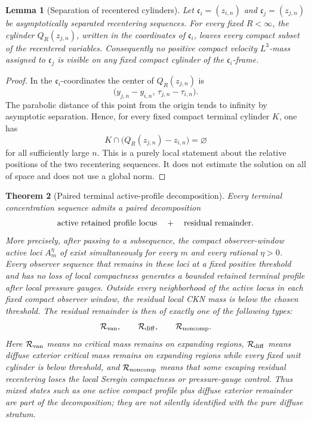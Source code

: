 \documentclass[11pt]{amsart}
\numberwithin{equation}{section}
\theoremstyle{plain}
\newtheorem{theorem}{Theorem}[section]
\newtheorem{lemma}[theorem]{Lemma}
\theoremstyle{definition}
\theoremstyle{remark}
\begin{document}
\begin{lemma}[Separation of recentered cylinders]
\label{lem:separated-recentered-cylinders}
Let \(\mathfrak c_i=(z_{i,n})\) and \(\mathfrak c_j=(z_{j,n})\) be
asymptotically separated recentering sequences.  For every fixed \(R<\infty\), the
cylinder \(Q_R(z_{j,n})\), written in the coordinates of \(\mathfrak c_i\),
leaves every compact subset of the recentered variables.  Consequently
no positive compact velocity \(L^3\)-mass assigned to \(\mathfrak c_j\) is visible on any
fixed compact cylinder of the \(\mathfrak c_i\)-frame.
\end{lemma}

\begin{proof}
In the \(\mathfrak c_i\)-coordinates the center of \(Q_R(z_{j,n})\) is
\[
   \bigl(y_{j,n}-y_{i,n},\,\tau_{j,n}-\tau_{i,n}\bigr).
\]
The parabolic distance of this point from the origin tends to infinity by
asymptotic separation.  Hence, for every fixed compact terminal cylinder
\(K\), one has
\[
   K\cap\bigl(Q_R(z_{j,n})-z_{i,n}\bigr)=\varnothing
\]
for all sufficiently large \(n\).  This is a purely local statement about the
relative positions of the two recentering sequences.  It does not estimate the solution on
all of space and does not use a global norm.
\end{proof}

\begin{theorem}[Paired terminal active-profile decomposition]
\label{thm:terminal-exhaustion-main}
Every terminal concentration sequence admits a paired decomposition
\[
   \hbox{active retained profile locus}
   \quad+\quad
   \hbox{residual remainder}.
\]
More precisely, after passing to a subsequence, the compact observer-window
active loci \(A_m^\eta\) of  exist
simultaneously for every \(m\) and every rational \(\eta>0\).  Every observer
sequence that remains in these loci at a fixed positive threshold and has no
loss of local compactness generates a bounded retained terminal profile after
local pressure gauges.  Outside every neighborhood of the active locus in each
fixed compact observer window, the residual local CKN mass is below the chosen
threshold.  The residual remainder is then of exactly one of the following
types:
\[
   \mathcal R_{\rm van},\qquad
   \mathcal R_{\rm diff},\qquad
   \mathcal R_{\rm noncomp}.
\]
Here \(\mathcal R_{\rm van}\) means no critical mass remains on expanding
regions, \(\mathcal R_{\rm diff}\) means diffuse exterior critical mass remains
on expanding regions while every fixed unit cylinder is below threshold, and
\(\mathcal R_{\rm noncomp}\) means that some escaping residual recentering loses
the local Seregin compactness or pressure-gauge control.  Thus mixed states such
as one active compact profile plus diffuse exterior remainder are part of the
decomposition; they are not silently identified with the pure diffuse stratum.
\end{theorem}
\end{document}
